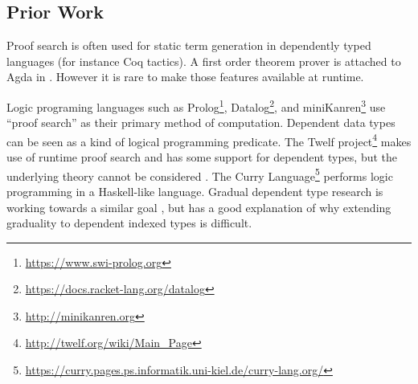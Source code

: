 \subsection{Prior Work}

Proof search is often used for static term generation in dependently typed languages (for instance Coq tactics).
A first order theorem prover is attached to Agda in \cite{norell2007towards}.
However it is rare to make those features available at runtime. 

Logic programing languages such as Prolog\footnote{\url{https://www.swi-prolog.org}}, Datalog\footnote{\url{https://docs.racket-lang.org/datalog}}, and miniKanren\footnote{\url{http://minikanren.org}} use ``proof search'' as their primary method of computation.
Dependent data types can be seen as a kind of logical programming predicate.
The Twelf project\footnote{\url{http://twelf.org/wiki/Main\_Page}} makes use of runtime proof search and has some support for dependent types, but the underlying theory cannot be considered \fullSp{}.
The Curry Language\footnote{\url{https://curry.pages.ps.informatik.uni-kiel.de/curry-lang.org/}} performs logic programming in a Haskell-like language.
Gradual dependent type research is working towards a similar goal \cite{10.1145/3341692}, but \cite{10.1145/3495528} has a good explanation of why extending graduality to dependent indexed types is difficult.

